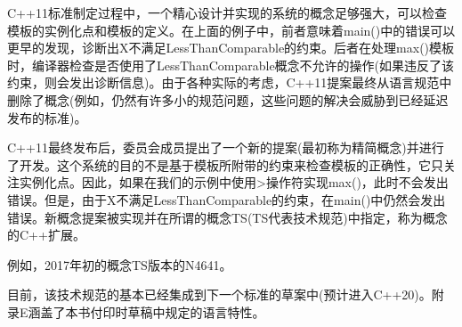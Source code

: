 C++11标准制定过程中，一个精心设计并实现的系统的概念足够强大，可以检查模板的实例化点和模板的定义。在上面的例子中，前者意味着main()中的错误可以更早的发现，诊断出X不满足LessThanComparable的约束。后者在处理max()模板时，编译器检查是否使用了LessThanComparable概念不允许的操作(如果违反了该约束，则会发出诊断信息)。由于各种实际的考虑，C++11提案最终从语言规范中删除了概念(例如，仍然有许多小的规范问题，这些问题的解决会威胁到已经延迟发布的标准)。

C++11最终发布后，委员会成员提出了一个新的提案(最初称为精简概念)并进行了开发。这个系统的目的不是基于模板所附带的约束来检查模板的正确性，它只关注实例化点。因此，如果在我们的示例中使用>操作符实现max()，此时不会发出错误。但是，由于X不满足LessThanComparable的约束，在main()中仍然会发出错误。新概念提案被实现并在所谓的概念TS(TS代表技术规范)中指定，称为概念的C++扩展。

\begin{tcolorbox}[colback=webgreen!5!white,colframe=webgreen!75!black]
\hspace*{0.75cm}例如，2017年初的概念TS版本的N4641。
\end{tcolorbox}

目前，该技术规范的基本已经集成到下一个标准的草案中(预计进入C++20)。附录E涵盖了本书付印时草稿中规定的语言特性。














































